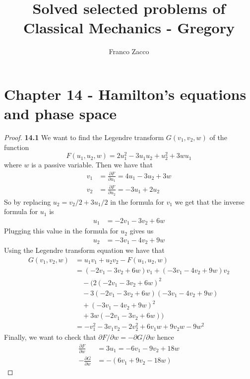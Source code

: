\documentclass[11pt]{article}
\title{\textbf{Solved selected problems of Classical Mechanics - Gregory}}
\author{Franco Zacco}
\date{}
\theoremstyle{definition}
\begin{document}
\maketitle
\thispagestyle{empty}

\section*{Chapter 14 - Hamilton's equations and phase space}

\begin{proof}{\textbf{14.1}}
    We want to find the Legendre transform $G(v_1, v_2, w)$ of the function
    $$F(u_1, u_2, w) = 2u_1^2 - 3u_1u_2 + u_2^2 + 3wu_1$$
    where $w$ is a passive variable.
    Then we have that
    \begin{align*}
        v_1 &= \frac{\partial F}{\partial u_1} = 4u_1 -3u_2 + 3w\\
        v_2 &= \frac{\partial F}{\partial u_2} = -3u_1 + 2u_2
    \end{align*}
    So by replacing $u_2 = v_2/2 + 3u_1/2$  in the formula for $v_1$ we get
    that the inverse formula for $u_1$ is
    \begin{align*}
        u_1 &= -2v_1 - 3v_2 + 6w
    \end{align*}
    Plugging this value in the formula for $u_2$ gives us
    \begin{align*}
        u_2 &= -3v_1 - 4v_2 + 9w
    \end{align*}
    Using the Legendre transform equation we have that
    \begin{align*}
        G(v_1, v_2, w) &= u_1v_1 + u_2v_2 - F(u_1, u_2, w)\\
        &= (-2v_1 - 3v_2 + 6w)v_1 + (-3v_1 - 4v_2 + 9w)v_2\\
        &\quad - (2(-2v_1 - 3v_2 + 6w)^2\\
        &\quad - 3(-2v_1 - 3v_2 + 6w)(-3v_1 - 4v_2 + 9w)\\
        &\quad + (-3v_1 - 4v_2 + 9w)^2\\
        &\quad + 3w(-2v_1 - 3v_2 + 6w))\\
        &= -v_1^2 - 3 v_1 v_2 - 2 v_2^2 + 6 v_1 w + 9 v_2 w - 9 w^2
    \end{align*}
    Finally, we want to check that $\partial F/\partial w = -\partial G/\partial w$
    hence
    \begin{align*}
        \frac{\partial F}{\partial w} &= 3u_1 =-6v_1 - 9v_2 + 18w\\
        -\frac{\partial G}{\partial w} &= -(6v_1 + 9v_2 - 18w)
    \end{align*}
\end{proof}
\end{document}
